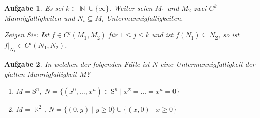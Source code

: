 \documentclass[paper=A4, twoside, chapterprefix=true, bibliography=totoc, headsepline]{scrbook}
\DeclareMathOperator{\N}{\mathbb{N}}
\DeclareMathOperator{\R}{\mathbb{R}}
\theoremstyle{plain}
\theoremstyle{nonumberplain}
\theoremstyle{empty}
\theoremstyle{break}
\newtheorem{Aufg}{Aufgabe}
\begin{document}
\begin{Aufg}
Es sei $k\in \N\cup\{\infty\}$. Weiter seien $M_1$ und $M_2$ zwei $C^k$-Mannigfaltigkeiten und $N_i \subseteq M_i$ Untermannigfaltigkeiten. 

Zeigen Sie: Ist $f \in C^j(M_1,M_2)$ für $1\leq j\leq k$ und ist $f( N_1)\subseteq N_2$, so ist $f|_{N_1}\in C^j(N_1,N_2)$.
\end{Aufg}

\begin{Aufg}
In welchen der folgenden Fälle ist $N$ eine Untermannigfaltigkeit der glatten Mannigfaltigkeit $M$?
\begin{enumerate}[label=\alph*),leftmargin=*,widest=b]
\item
	$M=\mathrm{S}^n$, $N=\{(x^0,\dots,x^n) \in \mathrm{S}^n \mid x^2=\dots =x^n=0\}$
\item
	$M=\R^2$, $N=\{(0,y) \mid y\geq 0\}\cup \{(x,0) \mid x\geq 0\}$
\end{enumerate}\end{Aufg}
\end{document}
